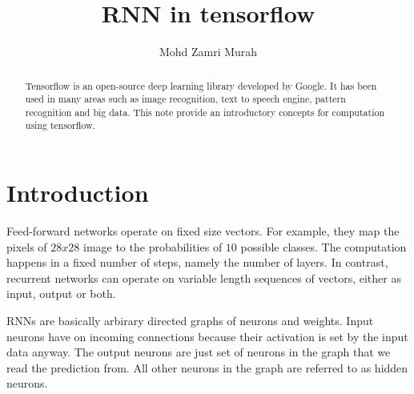 \documentclass[vecarrow]{svproc}
\begin{document}
\mainmatter %

\title{RNN in  tensorflow} %

\author{Mohd Zamri Murah} %

\maketitle %

\begin{abstract}

Tensorflow is an open-source
deep learning library developed by Google.
It has been used in many areas such as image recognition, text
to speech engine, pattern recognition and
big data. This note provide an introductory concepts for
computation using tensorflow.


\end{abstract} %

\section{Introduction}

Feed-forward networks operate on fixed size vectors. For example, they map the pixels of $28x28$ image to the probabilities of $10$ possible classes. The computation happens in a fixed number of steps, namely the number of layers. In contrast, recurrent networks can operate on variable length sequences of vectors, either as input, output or both.

RNNs are basically arbirary directed graphs of neurons and weights. Input neurons have
on incoming connections because their activation is set by the input data anyway. The
output neurons are just set of neurons in the graph that we read the prediction from. All
other neurons in the graph are referred to as hidden neurons.
\end{document}
